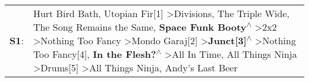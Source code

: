 \begin{supertabular}{p{0.03\textwidth}p{0.92\textwidth}}
 \textbf{S1}:  &  Hurt Bird Bath\textsuperscript{}, \enspace Utopian Fir[1]\textsuperscript{} \textgreater \enspace Divisions\textsuperscript{}, \enspace The Triple Wide\textsuperscript{}, \enspace The Song Remains the Same\textsuperscript{}, \enspace \textbf{Space Funk Booty\textsuperscript{$\wedge$}} \textgreater \enspace 2x2\textsuperscript{} \textgreater \enspace Nothing Too Fancy\textsuperscript{} \textgreater \enspace Mondo Garaj[2]\textsuperscript{} \textgreater \enspace \textbf{Junct[3]\textsuperscript{$\wedge$}} \textgreater \enspace Nothing Too Fancy[4]\textsuperscript{}, \enspace \textbf{In the Flesh?\textsuperscript{$\wedge$}} \textgreater \enspace All In Time\textsuperscript{}, \enspace All Things Ninja\textsuperscript{} \textgreater \enspace Drums[5]\textsuperscript{} \textgreater \enspace All Things Ninja\textsuperscript{}, \enspace Andy's Last Beer\textsuperscript{}  \enspace  \\
\end{supertabular}
